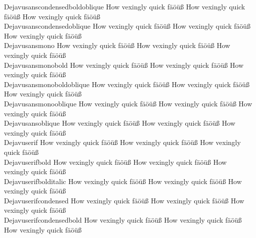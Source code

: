 \begin{tabbing}
Dejavusanscondensedboldoblique \> {\mktsStyleNormal{}How vexingly quick fäöüß} {\mktsFontfileDejavusanscondensedboldoblique{}How vexingly quick fäöüß} {\mktsStyleItalic{}How vexingly quick fäöüß} \\
Dejavusanscondensedoblique \> {\mktsStyleNormal{}How vexingly quick fäöüß} {\mktsFontfileDejavusanscondensedoblique{}How vexingly quick fäöüß} {\mktsStyleItalic{}How vexingly quick fäöüß} \\
Dejavusansmono \> {\mktsStyleNormal{}How vexingly quick fäöüß} {\mktsFontfileDejavusansmono{}How vexingly quick fäöüß} {\mktsStyleItalic{}How vexingly quick fäöüß} \\
Dejavusansmonobold \> {\mktsStyleNormal{}How vexingly quick fäöüß} {\mktsFontfileDejavusansmonobold{}How vexingly quick fäöüß} {\mktsStyleItalic{}How vexingly quick fäöüß} \\
Dejavusansmonoboldoblique \> {\mktsStyleNormal{}How vexingly quick fäöüß} {\mktsFontfileDejavusansmonoboldoblique{}How vexingly quick fäöüß} {\mktsStyleItalic{}How vexingly quick fäöüß} \\
Dejavusansmonooblique \> {\mktsStyleNormal{}How vexingly quick fäöüß} {\mktsFontfileDejavusansmonooblique{}How vexingly quick fäöüß} {\mktsStyleItalic{}How vexingly quick fäöüß} \\
Dejavusansoblique \> {\mktsStyleNormal{}How vexingly quick fäöüß} {\mktsFontfileDejavusansoblique{}How vexingly quick fäöüß} {\mktsStyleItalic{}How vexingly quick fäöüß} \\
Dejavuserif \> {\mktsStyleNormal{}How vexingly quick fäöüß} {\mktsFontfileDejavuserif{}How vexingly quick fäöüß} {\mktsStyleItalic{}How vexingly quick fäöüß} \\
Dejavuserifbold \> {\mktsStyleNormal{}How vexingly quick fäöüß} {\mktsFontfileDejavuserifbold{}How vexingly quick fäöüß} {\mktsStyleItalic{}How vexingly quick fäöüß} \\
Dejavuserifbolditalic \> {\mktsStyleNormal{}How vexingly quick fäöüß} {\mktsFontfileDejavuserifbolditalic{}How vexingly quick fäöüß} {\mktsStyleItalic{}How vexingly quick fäöüß} \\
Dejavuserifcondensed \> {\mktsStyleNormal{}How vexingly quick fäöüß} {\mktsFontfileDejavuserifcondensed{}How vexingly quick fäöüß} {\mktsStyleItalic{}How vexingly quick fäöüß} \\
Dejavuserifcondensedbold \> {\mktsStyleNormal{}How vexingly quick fäöüß} {\mktsFontfileDejavuserifcondensedbold{}How vexingly quick fäöüß} {\mktsStyleItalic{}How vexingly quick fäöüß} \\

\end{tabbing}
